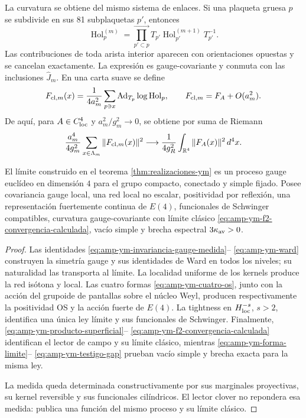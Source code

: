 La curvatura se obtiene del mismo sistema de enlaces.  Si una plaqueta
gruesa \(p\) se subdivide en sus 81 subplaquetas \(p'\), entonces
\begin{equation}\label{eq:amp-ym-producto-superficial}
 \operatorname{Hol}^{(m)}_{p}
 =\prod_{p'\subset p}^{\longrightarrow}
 T_{p'}\operatorname{Hol}^{(m+1)}_{p'}T_{p'}^{-1}.
\end{equation}
Las contribuciones de toda arista interior aparecen con orientaciones
opuestas y se cancelan exactamente.  La expresión es gauge-covariante y
conmuta con las inclusiones \(\widehat J_m\).  En una carta suave se define
\begin{equation}\label{eq:amp-ym-clover-definido}
 F_{{\rm cl},m}(x)
 =\frac1{4a_m^2}\sum_{p\ni x}
 \operatorname{Ad}_{T_p}\log\operatorname{Hol}_{p},
 \qquad
 F_{{\rm cl},m}=F_A+O(a_m^2).
\end{equation}
De aquí, para \(A\in C^4_{\rm loc}\) y
\(a_m^2/g_m^2\to0\), se obtiene por suma de Riemann
\begin{equation}\label{eq:amp-ym-f2-convergencia-calculada}
 \frac{a_m^4}{4g_m^2}
 \sum_{x\in\Lambda_m}\|F_{{\rm cl},m}(x)\|^2
 \longrightarrow
 \frac1{4g_R^2}\int_{\mathbb R^4}\|F_A(x)\|^2\,d^4x.
\end{equation}

\begin{theorem}
\label{thm:amp-ym-identificacion-gauge}
El límite construido en el teorema
\ref{thm:realizaciones-ym} es un proceso gauge euclídeo en dimensión
\(4\) para el grupo compacto, conectado y simple fijado. Posee
covariancia gauge local, una red local no escalar, positividad por
reflexión, una representación fuertemente continua de \(E(4)\),
funcionales de Schwinger compatibles, curvatura gauge-covariante con límite
clásico \eqref{eq:amp-ym-f2-convergencia-calculada}, vacío simple y brecha
espectral
\(3\kappa_{\rm av}>0\).
\end{theorem}

\begin{proof}
Las identidades \eqref{eq:amp-ym-invariancia-gauge-medida}--
\eqref{eq:amp-ym-ward} construyen la simetría gauge y sus identidades de
Ward en todos los niveles; su naturalidad las transporta al límite.  La
localidad uniforme de los kernels produce la red isótona y local.  Las
cuatro formas \eqref{eq:amp-ym-cuatro-os}, junto con la acción del grupoide
de pantallas sobre el núcleo Weyl, producen respectivamente la positividad
OS y la acción fuerte de \(E(4)\).  La tightness en
\(H^{-s}_{\rm loc}\), \(s>2\), identifica una única ley límite y sus
funcionales de Schwinger.  Finalmente,
\eqref{eq:amp-ym-producto-superficial}--
\eqref{eq:amp-ym-f2-convergencia-calculada} identifican el lector de campo
y su límite clásico, mientras
\eqref{eq:amp-ym-forma-limite}--
\eqref{eq:amp-ym-testigo-gap} prueban vacío simple y brecha exacta para la
misma ley.

La medida queda determinada constructivamente por sus marginales
proyectivas, su kernel reversible y sus funcionales cilíndricos. El lector
clover no repondera esa medida: publica una función del mismo proceso y su
límite clásico.
\end{proof}

